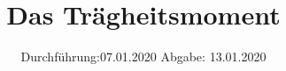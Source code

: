 

\subject{101}
\title{Das Trägheitsmoment}
\date{%
  Durchführung:07.01.2020
  \hspace{3em}
  Abgabe: 13.01.2020
}


\nocite{V101}
\maketitle
\thispagestyle{empty}
\tableofcontents
\newpage







\printbibliography{}


